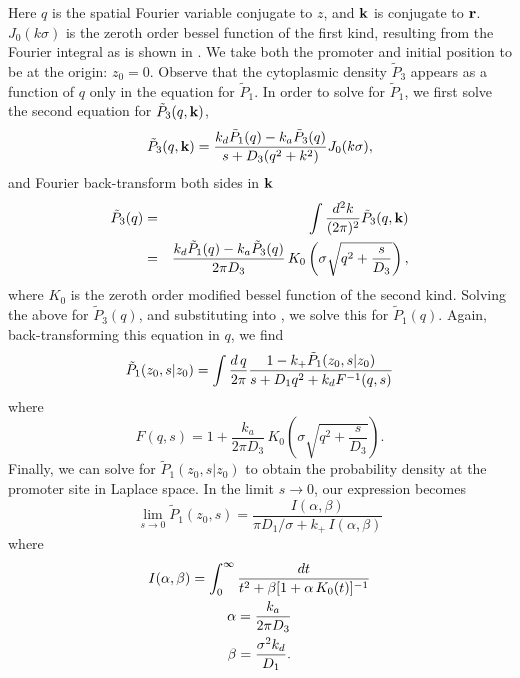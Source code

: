 Here $q$ is the spatial Fourier variable conjugate to $z$, and ${\bf k}$ is conjugate to ${\bf r}$. $J_0(k\sigma)$ is the zeroth order bessel function of the first kind, resulting from the Fourier integral as is shown in . We take both the promoter and initial position to be at the origin: $z_0 = 0$. Observe that the cytoplasmic density $\tilde{P}_3$ appears as a function of $q$ only in the equation for $\tilde{P}_1$. In order to solve for $\tilde{P}_1$, we first solve the second equation for $\tilde{P}_3(q,{\bf k})$, 
\begin{equation}
 \tilde{P}_3(q,{\bf k}) = \frac{k_d \tilde{P}_1(q) - k_a\tilde{P}_3(q)}{s + D_3(q^2 + k^2)} J_{0}(k \sigma ),
\end{equation}
and Fourier back-transform both sides in ${\bf k}$
\begin{eqnarray}
 \elabel{FourierBackC}
 \tilde{P}_3(q) & = & \int \frac{d^2 k}{(2 \pi)^2} \tilde{P}_3(q,{\bf k}) \\
 & = & \frac{k_d \tilde{P}_1(q) - k_a\tilde{P}_3(q)}{2 \pi D_3} \, K_{0}\left( \sigma \sqrt{q^2 + \frac{s}{D_3}} \right),
\end{eqnarray}
where $K_0$ is the zeroth order modified bessel function of the second kind. Solving the above for $\tilde{P}_3(q)$, and substituting into , we solve this for $\tilde{P}_1(q)$. Again, back-transforming this equation in $q$, we find
\begin{equation}
 \tilde{P}_1(z_0,s|z_0) = \int \frac{d\,q}{2 \pi} \frac{1-k_+ \tilde{P}_1(z_0,s|z_0)}{s + D_1 q^2+k_d F^{-1}(q,s)}
 \elabel{FDE_dna2}
\end{equation}
where
\begin{equation}
F(q,s) = 1 + \frac{k_a}{2 \pi D_3} \, K_{0}\left( \sigma \sqrt{q^2 + \frac{s}{D_3}} \right).
\end{equation}
Finally, we can solve  for $\tilde{P}_1(z_0, s|z_0)$ to obtain the probability density at the promoter site in Laplace space. In the limit $s \to 0$, our expression becomes
\begin{equation}
 \lim_{s \to 0} \tilde{P}_1(z_0, s) = \frac{I(\alpha,\beta)}{\pi D_1 / \sigma + k_+ \, I(\alpha,\beta)}
\end{equation}
where
\begin{gather}
 I(\alpha,\beta) = \int_0^{\infty} \frac{dt}{t^2 + \beta[1 + \alpha \, K_0(t)]^{-1}} \\
 \alpha = \frac{k_a}{2 \pi D_3} \elabel{EqAlpha} \\
 \beta = \frac{\sigma^2 k_d}{D_1} \elabel{EqBeta}.
\end{gather}
